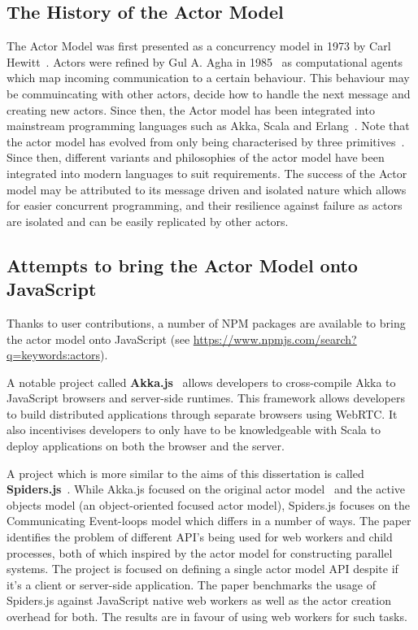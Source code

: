 \documentclass[12pt]{report}
\begin{document}
\subsection{The History of the Actor Model}
The Actor Model was first presented as a concurrency model in 1973 by Carl Hewitt~\cite{hewitt1973session}. Actors were refined by Gul A. Agha in 1985~\cite{agha1985actors} as computational agents which map incoming communication to a certain behaviour. This behaviour may be commuincating with other actors, decide how to handle the next message and creating new actors. Since then, the Actor model has been integrated into mainstream programming languages such as Akka, Scala and Erlang~\cite{43years}\cite{haller2012integration}. Note that the actor model has evolved from only being characterised by three primitives~\cite{agha1985actors}. Since then, different variants and philosophies of the actor model have been integrated into modern languages to suit requirements. The success of the Actor model may be attributed to its message driven and isolated nature which allows for easier concurrent programming, and their resilience against failure as actors are isolated and can be easily replicated by other actors\cite{reactivemanifesto}.
\subsection{Attempts to bring the Actor Model onto JavaScript}
Thanks to user contributions, a number of NPM packages are available to bring the actor model onto JavaScript (see \url{https://www.npmjs.com/search?q=keywords:actors}). 

A notable project called \textbf{Akka.js}~\cite{stivan2015akka} allows developers to cross-compile Akka to JavaScript browsers and server-side runtimes. This framework allows developers to build distributed applications through separate browsers using WebRTC. It also incentivises developers to only have to be knowledgeable with Scala to deploy applications on both the browser and the server.

A project which is more similar to the aims of this dissertation is called \textbf{Spiders.js}~\cite{spidersjs}. While Akka.js focused on the original actor model~\cite{agha1985actors} and the active objects model (an object-oriented focused actor model), Spiders.js focuses on the Communicating Event-loops model which differs in a number of ways. The paper identifies the problem of different API's being used for web workers and child processes, both of which inspired by the actor model for constructing parallel systems. The project is focused on defining a single actor model API despite if it's a client or server-side application. The paper benchmarks the usage of Spiders.js against JavaScript native web workers as well as the actor creation overhead for both. The results are in favour of using web workers for such tasks.
\end{document}

